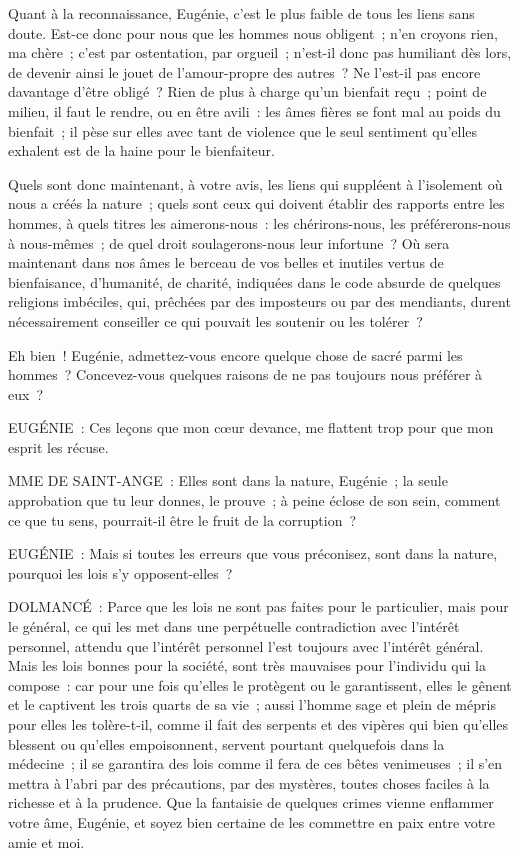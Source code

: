 \documentclass[french,twoside]{book} %
\begin{document}
Quant à la reconnaissance, Eugénie, c’est le plus faible de tous les liens sans doute. Est-ce donc pour nous que les hommes nous obligent ; n’en croyons rien, ma chère ; c’est par ostentation, par orgueil ; n’est-il donc pas humiliant dès lors, de devenir ainsi le jouet de l’amour-propre des autres ? Ne l’est-il pas encore davantage d’être obligé ? Rien de plus à charge qu’un bienfait reçu ; point de milieu, il faut le rendre, ou en être avili : les âmes fières se font mal au poids du bienfait ; il pèse sur elles avec tant de violence que le seul sentiment qu’elles exhalent est de la haine pour le bienfaiteur.\par
Quels sont donc maintenant, à votre avis, les liens qui suppléent à l’isolement où nous a créés la nature ; quels sont ceux qui doivent établir des rapports entre les hommes, à quels titres les aimerons-nous : les chérirons-nous, les préférerons-nous à nous-mêmes ; de quel droit soulagerons-nous leur infortune ? Où sera maintenant dans nos âmes le berceau de vos belles et inutiles vertus de bienfaisance, d’humanité, de charité, indiquées dans le code absurde de quelques religions imbéciles, qui, prêchées par des imposteurs ou par des mendiants, durent nécessairement conseiller ce qui pouvait les soutenir ou les tolérer ?\par
Eh bien ! Eugénie, admettez-vous encore quelque chose de sacré parmi les hommes ? Concevez-vous quelques raisons de ne pas toujours nous préférer à eux ?\par
EUGÉNIE : Ces leçons que mon cœur devance, me flattent trop pour que mon esprit les récuse.\par
MME DE SAINT-ANGE : Elles sont dans la nature, Eugénie ; la seule approbation que tu leur donnes, le prouve ; à peine éclose de son sein, comment ce que tu sens, pourrait-il être le fruit de la corruption ?\par
EUGÉNIE : Mais si toutes les erreurs que vous préconisez, sont dans la nature, pourquoi les lois s’y opposent-elles ?\par
DOLMANCÉ : Parce que les lois ne sont pas faites pour le particulier, mais pour le général, ce qui les met dans une perpétuelle contradiction avec l’intérêt personnel, attendu que l’intérêt personnel l’est toujours avec l’intérêt général. Mais les lois bonnes pour la société, sont très mauvaises pour l’individu qui la compose : car pour une fois qu’elles le protègent ou le garantissent, elles le gênent et le captivent les trois quarts de sa vie ; aussi l’homme sage et plein de mépris pour elles les tolère-t-il, comme il fait des serpents et des vipères qui bien qu’elles blessent ou qu’elles empoisonnent, servent pourtant quelquefois dans la médecine ; il se garantira des lois comme il fera de ces bêtes venimeuses ; il s’en mettra à l’abri par des précautions, par des mystères, toutes choses faciles à la richesse et à la prudence. Que la fantaisie de quelques crimes vienne enflammer votre âme, Eugénie, et soyez bien certaine de les commettre en paix entre votre amie et moi.\par
\end{document}
